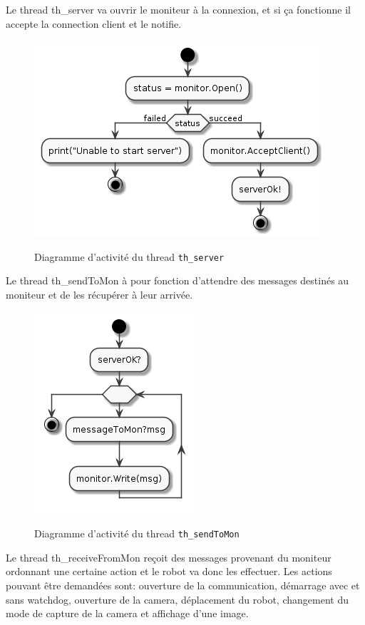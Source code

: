 \documentclass[11pt, a4paper]{paper}
\begin{document}
{Le thread th\_server va ouvrir le moniteur à la connexion, et si ça fonctionne il accepte la connection client et le notifie. } 

\begin{figure}[htbp]
\label{fig:act_envoyer}
\begin{center}
{\includegraphics[scale=.3]{./figures-pdf/th_server}}
{\caption{Diagramme d'activité du thread {\tt th\_server}}}
\end{center}
\end{figure}
\FloatBarrier

{Le thread th\_sendToMon à pour fonction d'attendre des messages destinés au moniteur et de les récupérer à leur arrivée. }

\begin{figure}[htbp]
\label{fig:act_envoyer}
\begin{center}
{\includegraphics[scale=.3]{./figures-pdf/th_sendToMon}}
{\caption{Diagramme d'activité du thread {\tt th\_sendToMon}}}
\end{center}
\end{figure}

{ Le thread th\_receiveFromMon reçoit des messages provenant du moniteur ordonnant une certaine action et le robot va donc les effectuer. Les actions pouvant être demandées sont: ouverture de la communication, démarrage avec et sans watchdog, ouverture de la camera, déplacement du robot, changement du mode de capture de la camera et affichage d'une image. }\\
\end{document}
